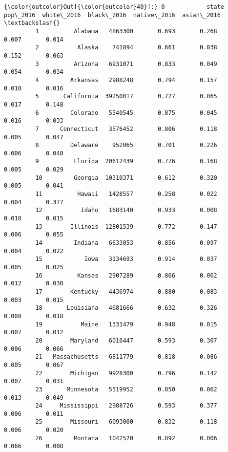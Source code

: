 \documentclass[11pt]{article}
\begin{document}
\begin{Verbatim}[commandchars=\\\{\}]
{\color{outcolor}Out[{\color{outcolor}40}]:} 0            state  pop\_2016  white\_2016  black\_2016  native\_2016  asian\_2016  \textbackslash{}
         1          Alabama   4863300       0.693       0.268        0.007       0.014   
         2           Alaska    741894       0.661       0.038        0.152       0.063   
         3          Arizona   6931071       0.833       0.049        0.054       0.034   
         4         Arkansas   2988248       0.794       0.157        0.010       0.016   
         5       California  39250017       0.727       0.065        0.017       0.148   
         6         Colorado   5540545       0.875       0.045        0.016       0.033   
         7      Connecticut   3576452       0.806       0.118        0.005       0.047   
         8         Delaware    952065       0.701       0.226        0.006       0.040   
         9          Florida  20612439       0.776       0.168        0.005       0.029   
         10         Georgia  10310371       0.612       0.320        0.005       0.041   
         11          Hawaii   1428557       0.258       0.022        0.004       0.377   
         12           Idaho   1683140       0.933       0.008        0.018       0.015   
         13        Illinois  12801539       0.772       0.147        0.006       0.055   
         14         Indiana   6633053       0.856       0.097        0.004       0.022   
         15            Iowa   3134693       0.914       0.037        0.005       0.025   
         16          Kansas   2907289       0.866       0.062        0.012       0.030   
         17        Kentucky   4436974       0.880       0.083        0.003       0.015   
         18       Louisiana   4681666       0.632       0.326        0.008       0.018   
         19           Maine   1331479       0.948       0.015        0.007       0.012   
         20        Maryland   6016447       0.593       0.307        0.006       0.066   
         21   Massachusetts   6811779       0.818       0.086        0.005       0.067   
         22        Michigan   9928300       0.796       0.142        0.007       0.031   
         23       Minnesota   5519952       0.850       0.062        0.013       0.049   
         24     Mississippi   2988726       0.593       0.377        0.006       0.011   
         25        Missouri   6093000       0.832       0.118        0.006       0.020   
         26         Montana   1042520       0.892       0.006        0.066       0.008   

\end{Verbatim}
\end{document}

